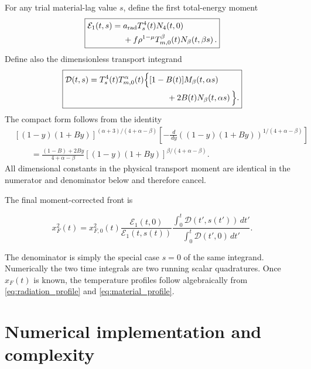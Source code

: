 \documentclass[11pt]{article}
\numberwithin{equation}{section}
\newcommand{\Ts}{T_s}
\newcommand{\Tm}{T_{m,0}}
\newcommand{\xf}{x_F}
\newcommand{\xfzero}{x_{F,0}}
\newcommand{\arad}{a_{\rm rad}}
\newcommand{\dif}{\,d}
\newcommand{\calE}{\mathcal{E}}
\newcommand{\calD}{\mathcal{D}}
\begin{document}
For any trial material-lag value $s$, define the first total-energy moment
\begin{equation}
 \boxed{
 \begin{aligned}
 \calE_1(t,s)
 ={}&\arad\Ts^4(t)N_4(t,0)
 \\
 &+f\rho^{1-\mu}\Tm^\beta(t)
 N_\beta\!\left(t,\beta s\right).
 \end{aligned}}
 \label{eq:E1}
\end{equation}
Define also the dimensionless transport integrand
\begin{equation}
 \boxed{
 \begin{aligned}
 \calD(t,s)
 ={}&\Ts^4(t)\Tm^\alpha(t)
 \Big\{[1-B(t)]M_\beta\!\left(t,\alpha s\right)
 \\
 &\hspace{29mm}
 +2B(t)N_\beta\!\left(t,\alpha s\right)\Big\}.
 \end{aligned}}
 \label{eq:D_compact}
\end{equation}
The compact form follows from the identity
\begin{equation}
 \begin{aligned}
 &\left[(1-y)(1+B y)\right]^{(\alpha+3)/(4+\alpha-\beta)}
 \left[-\frac{\dif}{\dif y}
 \left((1-y)(1+B y)\right)^{1/(4+\alpha-\beta)}\right]
 \\
 &\qquad=\frac{(1-B)+2By}{4+\alpha-\beta}
 \left[(1-y)(1+B y)\right]^{\beta/(4+\alpha-\beta)}.
 \end{aligned}
 \label{eq:transport_identity}
\end{equation}
All dimensional constants in the physical transport moment are identical in
the numerator and denominator below and therefore cancel.

The final moment-corrected front is
\begin{resultbox}
\begin{equation}
 \boxed{
 \xf^2(t)
 =\xfzero^2(t)
 \frac{\calE_1(t,0)}{\calE_1(t,s(t))}
 \frac{\displaystyle\int_0^t
 \calD\!\left(t',s(t')\right)\dif t'}
 {\displaystyle\int_0^t
 \calD(t',0)\dif t'}.}
 \label{eq:xf_final}
\end{equation}
\end{resultbox}
The denominator is simply the special case $s=0$ of the same integrand.
Numerically the two time integrals are two running scalar quadratures.  Once
$\xf(t)$ is known, the temperature profiles follow algebraically from
\eqref{eq:radiation_profile} and \eqref{eq:material_profile}.

\section{Numerical implementation and complexity}
\end{document}
